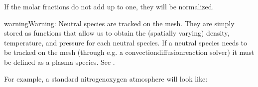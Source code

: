 \documentclass[letterpaper,10pt,english]{sphinxmanual}
\begin{document}
\sphinxAtStartPar
If the molar fractions do not add up to one, they will be normalized.

\begin{sphinxadmonition}{warning}{Warning:}
\sphinxAtStartPar
Neutral species are  tracked on the mesh.
They are simply stored as functions that allow us to obtain the (spatially varying) density, temperature, and pressure for each neutral species.
If a neutral species needs to be tracked on the mesh (through e.g. a convection\sphinxhyphen{}diffusion\sphinxhyphen{}reaction solver) it must be defined as a plasma species.
See {\hyperref[\detokenize{Applications/CdrPlasmaModel:chap-plasmaspeciesjson}]{}}.
\end{sphinxadmonition}

\sphinxAtStartPar
For example, a standard nitrogen\sphinxhyphen{}oxygen atmosphere will look like:

\begin{sphinxVerbatim}[commandchars=\\\{\},formatcom=\scriptsize]
       
       
       
       
      \PYG{p}{[}
           
           
           
           
    \PYG{p}{]}
\end{sphinxVerbatim}
\end{document}
